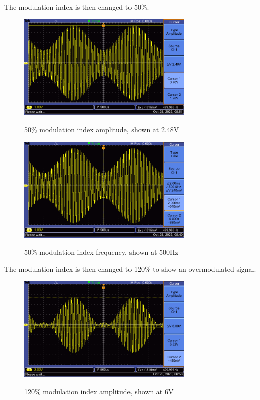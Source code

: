 The modulation index is then changed to 50\%.
\begin{figure}[H]
    \centering
    \includegraphics[width=0.75\textwidth]{images/execution_01_05_amp.png}
    \label{fig:execution_01_05_amplitude}
    \caption{50\% modulation index amplitude, shown at 2.48V}
\end{figure}
\begin{figure}[H]
    \centering
    \includegraphics[width=0.75\textwidth]{images/execution_01_05_freq.png}
    \label{fig:execution_01_05_frequency}
    \caption{50\% modulation index frequency, shown at 500Hz}
\end{figure}

The modulation index is then changed to 120\% to show an overmodulated signal.

\begin{figure}[H]
    \centering
    \includegraphics[width=0.75\textwidth]{images/execution_01_12_amp.png}
    \label{fig:execution_01_12_amplitude}
    \caption{120\% modulation index amplitude, shown at 6V}
\end{figure}

